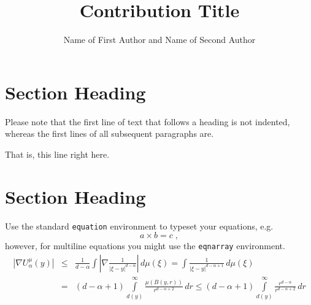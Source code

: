 %
	
\begin{bibunit}
	
	\title*{Contribution Title}
	\author{Name of First Author and Name of Second Author}
	\maketitle
	
	
	\section{Section Heading}\label{01:section:1}
	
	Please note that the first line of text that follows a heading is not indented, whereas the first lines of all subsequent paragraphs are.
	
	That is, this line right here.
	
	\section{Section Heading}\label{01:section:2}
	
	Use the standard \verb|equation| environment to typeset your equations, e.g.
	\begin{equation}
	a \times b = c\;,
	\end{equation}
	however, for multiline equations you might use the \verb|eqnarray| environment.
	\begin{eqnarray}
	\left|\nabla U_{\alpha}^{\mu}(y)\right| &\le&\frac1{d-\alpha}\int
	\left|\nabla\frac1{|\xi-y|^{d-\alpha}}\right|\,d\mu(\xi) =
	\int \frac1{|\xi-y|^{d-\alpha+1}} \,d\mu(\xi)  \\
	&=&(d-\alpha+1) \int\limits_{d(y)}^\infty
	\frac{\mu(B(y,r))}{r^{d-\alpha+2}}\,dr \le (d-\alpha+1)
	\int\limits_{d(y)}^\infty \frac{r^{d-\alpha}}{r^{d-\alpha+2}}\,dr
	\label{eq:01}
	\end{eqnarray}
	

\end{bibunit}
